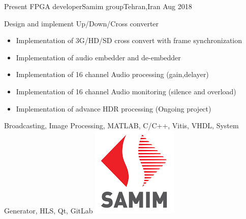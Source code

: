 
\begin{experiences}

  \experience
  {Present} {FPGA developer}{Samim group}{Tehran,Iran}
  {Aug 2018} {
    Design and implement Up/Down/Cross converter
    \begin{itemize}
      \item Implementation of 3G/HD/SD cross convert with frame synchronization
      \item Implementation of audio embedder and de-embedder
      \item Implementation of 16 channel Audio processing (gain,delayer)
      \item Implementation of 16 channel Audio  monitoring (silence and overload)
      \item Implementation of advance HDR processing (Ongoing project)
    \end{itemize}
  }
  {Broadcasting, Image Processing, MATLAB, C/C++, Vitis, VHDL, System Generator, HLS, Qt, GitLab}
  {\includegraphics[scale=0.2]{graphics/samim_logo}}

  \emptySeparator


\end{experiences}
